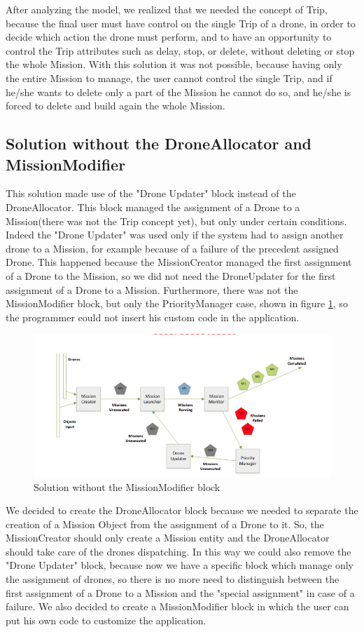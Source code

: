 After analyzing the model, we realized that we needed the concept of Trip, because the final user must have control on the single Trip of a drone, in order to decide which action the drone must perform, and to have an opportunity to control the Trip attributes such as delay, stop, or delete, without deleting or stop the whole Mission. 
With this solution it was not possible, because having only the entire Mission to manage, the user cannot control the single Trip, and if he/she wants to delete only a part of the Mission he cannot do so, and he/she is forced to delete and build again the whole Mission.

\subsection{Solution without the DroneAllocator and MissionModifier}

This solution made use of the "Drone Updater" block instead of the DroneAllocator. 
This block managed the assignment of a Drone to a Mission(there was not the Trip concept yet), but only under certain conditions.
Indeed the "Drone Updater" was used only if the system had to assign another drone to a Mission, for example because of a failure of the precedent assigned Drone.
This happened because the MissionCreator managed the first assignment of a Drone to the Mission, so we did not need the DroneUpdater for the first assignment of a Drone to a Mission.
Furthermore, there was not the MissionModifier block, but only the PriorityManager case, shown in figure \ref{fig:noMM}, so the programmer could not insert his custom code in the application.


\begin{figure}[H]
  \centering
  \includegraphics[width=\linewidth]{pictures/NoMM.png}
  \caption{Solution without the MissionModifier block}
  \label{fig:noMM}
\end{figure}

We decided to create the DroneAllocator block because we needed to separate the creation of a Mission Object from the assignment of a Drone to it.
So, the MissionCreator should only create a Mission entity and the DroneAllocator should take care of the drones dispatching.
In this way we could also remove the "Drone Updater" block, because now we have a specific block which manage only the assignment of drones, so there is no more need to distinguish between the first assignment of a Drone to a Mission and the "special assignment" in case of a failure.
We also decided to create a MissionModifier block in which the user can put his own code to customize the application.